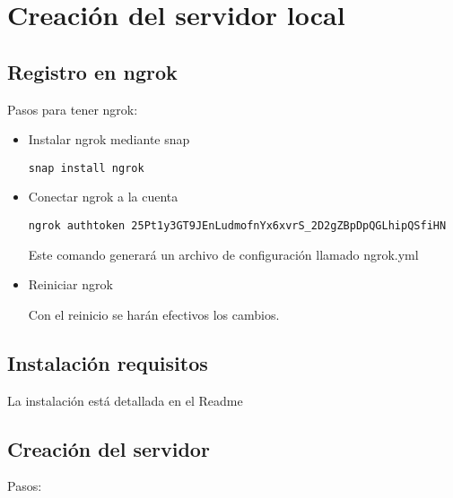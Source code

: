 \chapter{Creación del servidor local}

\section{Registro en ngrok}

Pasos para tener ngrok:

\begin{itemize}
    \item Instalar ngrok mediante snap
    
\begin{lstlisting}
snap install ngrok
\end{lstlisting} 

    \item Conectar ngrok a la cuenta
  
\begin{lstlisting}
ngrok authtoken 25Pt1y3GT9JEnLudmofnYx6xvrS_2D2gZBpDpQGLhipQSfiHN
\end{lstlisting}  


Este comando generará un archivo de configuración llamado ngrok.yml

    \item Reiniciar ngrok
    
Con el reinicio se harán efectivos los cambios.
    
\end{itemize}

\section{Instalación requisitos}

La instalación está detallada en el Readme

\section{Creación del servidor}

Pasos:


